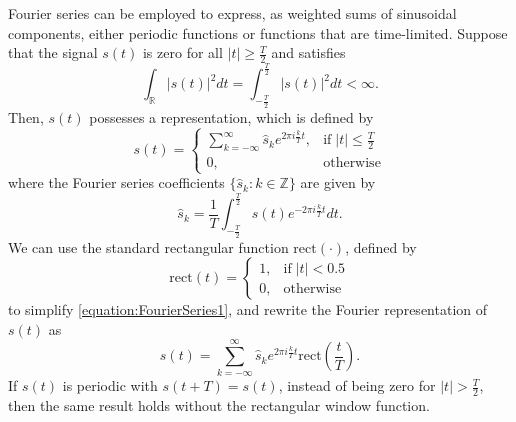Fourier series can be employed to express, as weighted sums of sinusoidal components, either periodic functions or functions that are time-limited.
Suppose that the signal $s(t)$ is zero for all $|t|\geq\frac{T}{2}$ and satisfies
\begin{equation*}
\int_{\mathbb{R}} |s(t)|^2 dt =
\int_{-\frac{T}{2}}^{\frac{T}{2}} |s(t)|^2 dt < \infty .
\end{equation*}
Then, $s(t)$ possesses a  representation, which is defined by
\begin{equation} \label{equation:FourierSeries1}
s(t) = \begin{cases} \sum_{k=-\infty}^{\infty}
\hat{s}_k e^{2 \pi i \frac{k}{T} t}, & \mathrm{if} \; |t| \leq \frac{T}{2} \\
0, & \text{otherwise} \end{cases}
\end{equation}
where the Fourier series coefficients $\{ \hat{s}_k : k \in \mathbb{Z} \}$ are given by
\begin{equation*}
\hat{s}_k = \frac{1}{T} \int_{-\frac{T}{2}}^{\frac{T}{2}}
s(t) e^{-2 \pi i \frac{k}{T} t} dt .
\end{equation*}
We can use the standard rectangular function $\mathrm{rect}(\cdot)$, defined by
\begin{equation} \label{equation:RectangularFunction}
\mathrm{rect} (t) = \begin{cases} 1, & \mathrm{if}\; |t| < 0.5 \\
0, & \text{otherwise} \end{cases}
\end{equation}
to simplify \eqref{equation:FourierSeries1}, and rewrite the Fourier representation of $s(t)$ as
\begin{equation} \label{equation:FourierSeries2}
s(t) = \sum_{k=-\infty}^{\infty}
\hat{s}_k e^{2 \pi i \frac{k}{T} t}
\mathrm{rect} \left( \frac{t}{T} \right) .
\end{equation}
If $s(t)$ is periodic with $s(t+T)=s(t)$, instead of being zero for $|t|>\frac{T}{2}$, then the same result holds without the rectangular window function.

